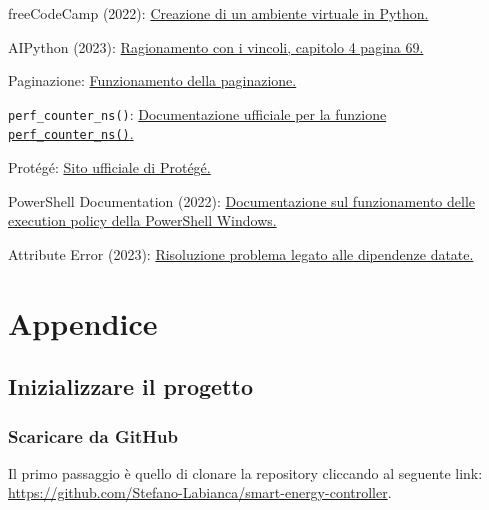 \documentclass[12pt, letterpaper]{article}
\begin{document}
\begin{thebibliography}{100}
      freeCodeCamp (2022):  \href{https://www.freecodecamp.org/news/how-to-setup-virtual-environments-in-python/}{
            Creazione di un ambiente virtuale in Python.
      }

      AIPython (2023): \href{https://artint.info/AIPython/aipython/aipython.pdf}{
            Ragionamento con i vincoli, capitolo 4 pagina 69.
      }

      Paginazione: \href{https://www.educative.io/answers/what-is-pagination}{
            Funzionamento della paginazione.
      }


      \lstinline|perf_counter_ns()|: \href{https://docs.python.org/3/library/time.html#time.perf_counter_ns}{
            Documentazione ufficiale per la funzione \lstinline|perf_counter_ns()|.
      }

      Protégé: \href{https://protege.stanford.edu/}{Sito ufficiale di Protégé.}


      PowerShell Documentation (2022):
      \href{https://learn.microsoft.com/en-gb/powershell/module/microsoft.powershell.core/about/about_execution_policies?view=powershell-7.4}{
            Documentazione sul funzionamento delle execution policy della PowerShell Windows.
      }

      Attribute Error (2023): \href{https://stackoverflow.com/questions/70749690/attributeerror-module-collections-has-no-attribute-mapping}{
            Risoluzione problema legato alle dipendenze datate.
      }
\end{thebibliography}

\section{Appendice}

\subsection{Inizializzare il progetto}

\subsubsection{Scaricare da GitHub}

Il primo passaggio è quello di clonare la repository cliccando al seguente link:
\url{https://github.com/Stefano-Labianca/smart-energy-controller}. \\
\end{document}
